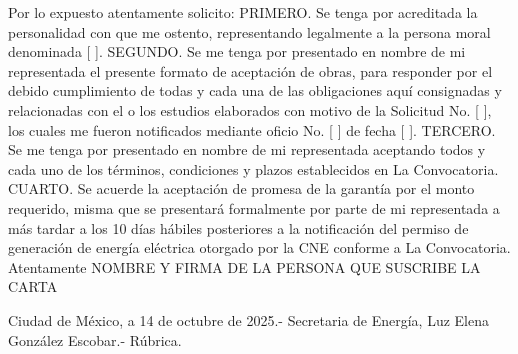Por lo expuesto atentamente solicito:
PRIMERO. Se tenga por acreditada la personalidad con que me ostento, representando legalmente a la persona moral denominada [  ].
SEGUNDO. Se me tenga por presentado en nombre de mi representada el presente formato de aceptación de obras, para responder por el debido cumplimiento de todas y cada una de las obligaciones aquí consignadas y relacionadas con el o los estudios elaborados con motivo de la Solicitud No. [  ], los cuales me fueron notificados mediante oficio No. [  ] de fecha [  ].
TERCERO. Se me tenga por presentado en nombre de mi representada aceptando todos y cada uno de los términos, condiciones y plazos establecidos en La Convocatoria.
CUARTO. Se acuerde la aceptación de promesa de la garantía por el monto requerido, misma que se presentará formalmente por parte de mi representada a más tardar a los 10 días hábiles posteriores a la notificación del permiso de generación de energía eléctrica otorgado por la CNE conforme a La Convocatoria. 
Atentamente
NOMBRE Y FIRMA DE LA PERSONA QUE SUSCRIBE LA CARTA

 
 
Ciudad de México, a 14 de octubre de 2025.- Secretaria de Energía, Luz Elena González Escobar.- Rúbrica.\par
\endgroup
